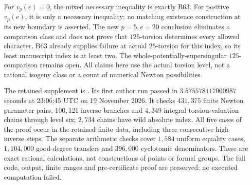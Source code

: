 \begin{remark}
\label{rem:B-RD76-scope}
For \(v_p(e)=0\), the mixed necessary inequality is exactly B63.
For positive \(v_p(e)\), it is only a necessary inequality; no
matching existence construction at its new boundary is asserted.
The new \(p=5,e=20\) conclusion eliminates a comparison class
and does not prove that \(125\)-torsion determines every allowed
character. B63 already supplies failure at actual \(25\)-torsion
for this index, so its least manuscript index is at least two.
The whole-potentially-supersingular \(125\)-comparison remains
open. All claims here use the actual torsion level, not a rational
isogeny class or a count of numerical Newton possibilities.

The retained supplement is
.
Its first author run passed in \(3.575578117000987\) seconds
at 23:06:45 UTC on 19 November 2026. It checks \(431{,}375\)
finite Newton parameter pairs, \(100{,}121\) inverse branches
and \(4{,}349\) integral torsion-valuation chains through level
six; \(2{,}734\) chains have wild absolute index. All five
cases of the proof occur in the retained finite data, including
three consecutive high inverse steps. The separate arithmetic
checks cover \(1{,}584\) uniform equality cases,
\(1{,}104{,}000\) good-degree transfers and \(396{,}000\)
cyclotomic denominators. These are exact rational calculations,
not constructions of points or formal groups. The full code,
output, finite ranges and pre-certificate proof are preserved;
no executed computation failed.
\end{remark}
